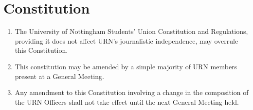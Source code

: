 \section{Constitution}

\begin{enumerate}[label*=\thesection.\arabic*.]
    \item The University of Nottingham Students' Union Constitution and Regulations, providing it does not affect URN's journalistic independence, may overrule this Constitution.
    \item This constitution may be amended by a simple majority of URN members present at a General Meeting.
    \item Any amendment to this Constitution involving a change in the composition of the URN Officers shall not take effect until the next General Meeting held.
\end{enumerate}
